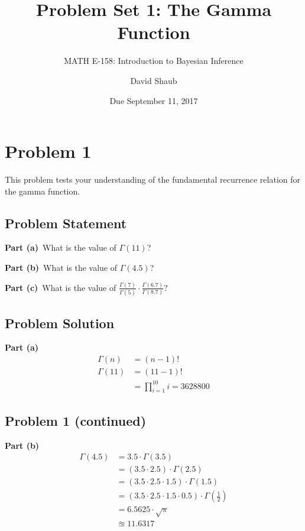 \documentclass[12pt]{article}
\title{Problem Set 1: The Gamma Function}
\author{MATH E-158: Introduction to Bayesian Inference}
\author{David Shaub}
\date{Due September 11, 2017}
\theoremstyle{definition}
\begin{document}
	
	\maketitle





\section*{Problem 1}

This problem tests your understanding of the fundamental recurrence relation for the gamma function.

\subsection*{Problem Statement}

\noindent
{\bf Part (a)}\ What is the value of $\Gamma(11)$?

\bigskip
\noindent
{\bf Part (b)}\ What is the value of $\Gamma(4.5)$?

\bigskip
\noindent
{\bf Part (c)}\ What is the value of $\displaystyle \frac{ \Gamma(7) }{\Gamma(5)} \cdot \frac{\Gamma(6.7)}{\Gamma(8.7)}?$

\subsection*{Problem Solution}

\noindent
{\bf Part (a)}
\begin{align*}
\Gamma(n) &= (n - 1)!\\
\Gamma(11) &= (11 - 1)!\\
           &= \prod_{i=1}^{10} i = 3628800
\end{align*}

\newpage
\subsection*{Problem 1 (continued)}
\noindent
{\bf Part (b)}
\begin{align*}
\Gamma(4.5) &= 3.5 \cdot \Gamma(3.5)\\
            &= (3.5 \cdot 2.5) \cdot \Gamma(2.5)\\
            &= (3.5 \cdot 2.5 \cdot 1.5) \cdot \Gamma(1.5)\\
            &= (3.5 \cdot 2.5 \cdot 1.5 \cdot 0.5) \cdot \Gamma(\frac{1}{2})\\
            &= 6.5625 \cdot \sqrt{\pi}\\
            &\approxeq 11.6317
\end{align*}
\end{document}
